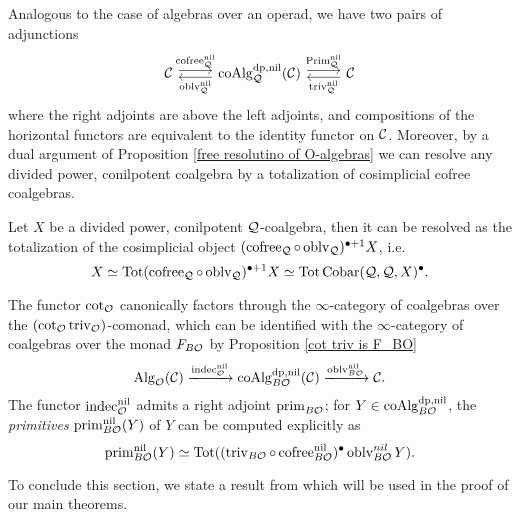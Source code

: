 Analogous to the case of algebras over an operad, we have two pairs of adjunctions 
\[
\begin{tikzcd}
\CC & \coAlg^{\divpow, \nil}_{\CQ}(\CC) & \CC
	\arrow[from=1-1, to= 1-2, shift left = 1, "\cofree^{\nil}_{\CQ}" above]
	\arrow[from=1-2, to=1-1, shift left = 1, "\oblv^{\nil}_{\CQ}" below]
	\arrow[from=1-2, to= 1-3, shift left = 1, "\operatorname{Prim}^{\nil}_{\CQ}" above]
	\arrow[from=1-3, to=1-2, shift left = 1, "\trivial^{\nil}_{\CQ}" below]
\end{tikzcd}
\]
where the right adjoints are above the left adjoints,
and compositions of the horizontal functors are equivalent to the identity functor on ${\mathcal{C}}$.
Moreover, by a dual argument of Proposition \ref{free resolutino of O-algebras} we can resolve any divided power, conilpotent coalgebra by a totalization of cosimplicial cofree coalgebras.
\begin{proposition}
Let $X$ be a divided power, conilpotent ${\mathcal{Q}}$-coalgebra, then it can be resolved as the totalization of the cosimplicial object $(\operatorname{cofree}_{{\mathcal{Q}}}\circ \operatorname{oblv}_{{\mathcal{Q}}})^{\bullet + 1}X$, i.e. 
\begin{equation}
\label{(3.5)}
    X \simeq
\operatorname{\operatorname{Tot}} (\operatorname{cofree}_{{\mathcal{Q}}}\circ \operatorname{oblv}_{{\mathcal{Q}}})^{\bullet + 1}X
\simeq \operatorname{\operatorname{Tot}} \operatorname{Cobar}({\mathcal{Q}}, {\mathcal{Q}}, X)^{\bullet}.
\end{equation}
\end{proposition}



The functor $\cot_{{\mathcal{O}}}$ canonically factors through the $\infty$-category of coalgebras over the $(\cot_{{\mathcal{O}}}\operatorname{triv}_{{\mathcal{O}}})$-comonad, which can be identified with the $\infty$-category of coalgebras over the monad $F_{B{\mathcal{O}}}$ by Proposition \ref{cot triv is F_BO}
$$
\operatorname{Alg}_{{\mathcal{O}}}({\mathcal{C}}) \xrightarrow{\operatorname{indec}^{\operatorname{nil}}_{{\mathcal{O}}}}
\operatorname{coAlg}^{\operatorname{dp}, \operatorname{nil}}_{B{\mathcal{O}}}({\mathcal{C}})
\xrightarrow{\operatorname{oblv}_{B{\mathcal{O}}}^{\operatorname{nil}}}
{\mathcal{C}}.
$$
The functor $\operatorname{indec}^{\operatorname{nil}}_{{\mathcal{O}}}$ admits a right adjoint $\operatorname{prim}_{B{\mathcal{O}}}$;
for $Y \in \operatorname{coAlg}^{\operatorname{dp}, \operatorname{nil}}_{B{\mathcal{O}}} $, the \emph{primitives} $\operatorname{prim}_{B{\mathcal{O}}}^{\operatorname{nil}}(Y)$ of $Y$ can be computed explicitly as \cite[Lemma 4.7]  {Heuts_Koszul}
$$
\operatorname{prim}_{B{\mathcal{O}}}^{\operatorname{nil}}(Y) \simeq \operatorname{\operatorname{Tot}} ( (\operatorname{triv}_{B{\mathcal{O}}}\circ \operatorname{cofree}^{\operatorname{nil}}_{B{\mathcal{O}}})^{\bullet} \operatorname{oblv}^{nil}_{B{\mathcal{O}}} Y).
$$

To conclude this section, we state a result from \cite{Heuts_Koszul} which will be used in the proof of our main theorems.

